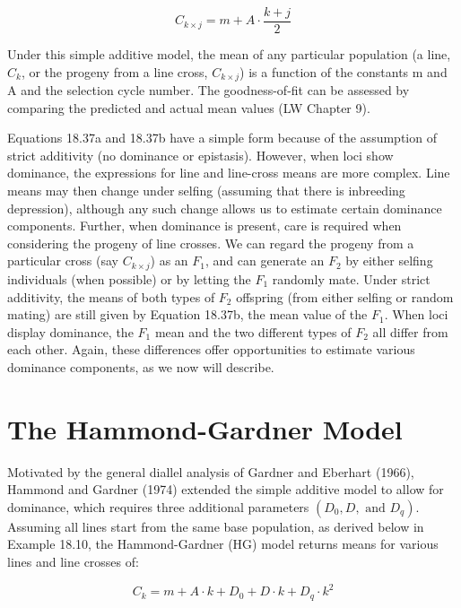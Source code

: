 \documentclass{article}
\begin{document}
\begin{equation}
C_{k\times j}=m+A\cdot\frac{k+j}{2}
\tag{18.37b}
\label{eq:18_37b}
\end{equation}

Under this simple additive model, the mean of any particular population (a line,  $ C_k $, or the progeny from a line cross,  $ C_{k \times j} $) is a function of the constants m and A and the selection cycle number. The goodness-of-fit can be assessed by comparing the predicted and actual mean values (LW Chapter 9).

Equations 18.37a and 18.37b have a simple form because of the assumption of strict additivity (no dominance or epistasis). However, when loci show dominance, the expressions for line and line-cross means are more complex. Line means may then change under selfing (assuming that there is inbreeding depression), although any such change allows us to estimate certain dominance components. Further, when dominance is present, care is required when considering the progeny of line crosses. We can regard the progeny from a particular cross (say  $ C_{k \times j} $) as an  $ F_1 $, and can generate an  $ F_2 $ by either selfing individuals (when possible) or by letting the  $ F_1 $ randomly mate. Under strict additivity, the means of both types of  $ F_2 $ offspring (from either selfing or random mating) are still given by Equation 18.37b, the mean value of the  $ F_1 $. When loci display dominance, the  $ F_1 $ mean and the two different types of  $ F_2 $ all differ from each other. Again, these differences offer opportunities to estimate various dominance components, as we now will describe.

\section{The Hammond-Gardner Model}
Motivated by the general diallel analysis of Gardner and Eberhart (1966), Hammond and Gardner (1974) extended the simple additive model to allow for dominance, which requires three additional parameters  $ (D_{0}, D, \text{ and } D_{q}) $. Assuming all lines start from the same base population, as derived below in Example 18.10, the Hammond-Gardner (HG) model returns means for various lines and line crosses of:

\begin{equation}
C_{k}=m+A\cdot k+D_{0}+D\cdot k+D_{q}\cdot k^{2}
\tag{18.38a}
\label{eq:18_38a}
\end{equation}
\end{document}
